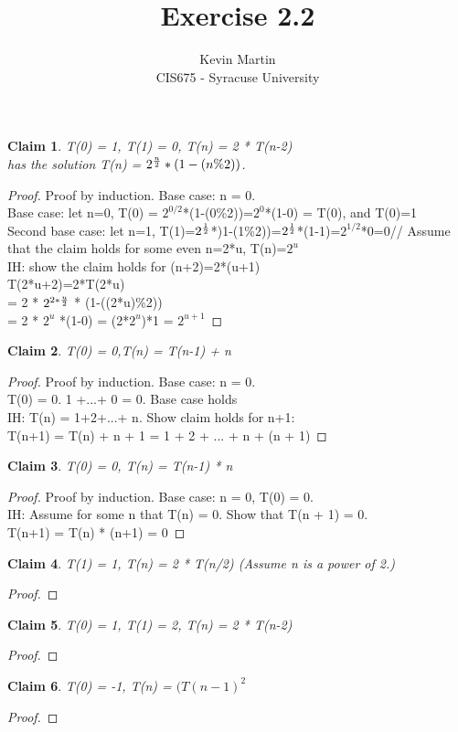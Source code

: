 \documentclass{article}
\author{Kevin Martin\\ CIS675 - Syracuse University}
\title{Exercise 2.2}
\newtheorem{claim}{Claim}
\begin{document}
\maketitle
\begin{claim}
  T(0) = 1, T(1) = 0, T(n) = 2 * T(n-2)\\
  has the solution T(n) = \(2^{n\over 2}*(1-(n\%2))\).
\end{claim}
 
\begin{proof}
Proof by induction. Base case: n = 0.\\
  Base case: let n=0, T(0) = \(2^{0/2}\)*(1-(0\%2))=\(2^0\)*(1-0) = T(0), and T(0)=1\\
  Second base case: let n=1, T(1)=\(2^{1\over 2}\)*)1-(1\%2))=\(2^{1\over 2}\)*(1-1)=\(2^{1/2}\)*0=0//
  Assume that the claim holds for some even n=2*u, T(n)=\(2^u\)\\
  IH: show the claim holds for (n+2)=2*(u+1)\\
  T(2*u+2)=2*T(2*u)\\
        = 2 * \(2^{2*{u\over 2}}\) * (1-((2*u)\%2))\\
        = 2 * \(2^{u}\) *(1-0) = (2*\(2^{u}\))*1 = \(2^{u+1}\)

\end{proof}

\begin{claim}
  T(0) = 0,T(n) = T(n-1) + n
\end{claim}
 
\begin{proof}
Proof by induction. Base case: n = 0.\\
  T(0) = 0. 1 +...+ 0 = 0. Base case holds\\
  IH: T(n) = 1+2+...+ n. Show claim holds for n+1:\\
  T(n+1) = T(n) + n + 1 = 1 + 2 + ... + n + (n + 1)
\end{proof}

\begin{claim}
  T(0) = 0, T(n) = T(n-1) * n
\end{claim}
 
\begin{proof}
  Proof by induction. Base case: n = 0, T(0) = 0.\\
  IH: Assume for some n that T(n) = 0. Show that T(n + 1) = 0.\\
  T(n+1) = T(n) * (n+1) = 0
\end{proof}
\begin{claim}
  T(1) = 1, T(n) = 2 * T(n/2) (Assume n is a power of 2.)
\end{claim}
 
\begin{proof}
\end{proof}
\begin{claim}
  T(0) = 1, T(1) = 2, T(n) = 2 * T(n-2)
\end{claim}
 
\begin{proof}
\end{proof}

\begin{claim}
  T(0) = -1, T(n) = \((T(n-1)^2\)
\end{claim}
 
\begin{proof}
\end{proof}
\end{document}
